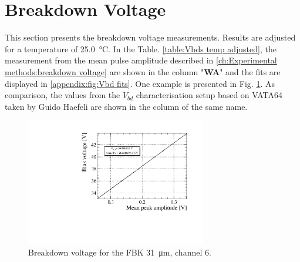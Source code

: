 \section{Breakdown Voltage}
\label{ch:Results:breakdown voltage}
This section presents the breakdown voltage measurements. Results are adjusted for a temperature of \SI{25.0}{\celsius}. In the Table. \ref{table:Vbds temp adjusted}, the measurement from the mean pulse amplitude described in \ref{ch:Experimental methods:breakdown voltage} are shown in the column "\textbf{WA}" and the fits are displayed in \ref{appendix:fig:Vbd fits}. One example is presented in Fig. \ref{fig:Vbd 31um chan6}. As comparison, the values from the $V_{bd}$ characterisation setup based on VATA64 taken by Guido Haefeli are shown in the column of the same name. 
\begin{figure}[htbp]
    \centering
    \includegraphics[width=0.7\textwidth]{gfx/plots/WA/31/Breakdown_voltage6.pdf}
    \caption{Breakdown voltage for the FBK \SI{31}{\micro m}, channel $6$.}
    \label{fig:Vbd 31um chan6}
\end{figure}

